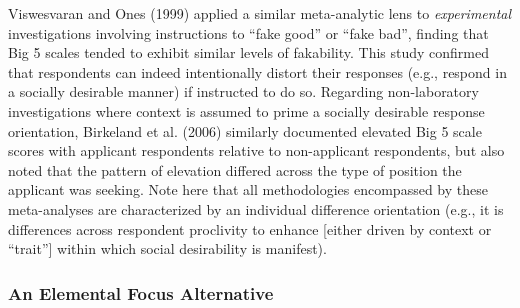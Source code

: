 \documentclass[
  english,
  ,jou]{apa6}
\begin{document}
Viswesvaran and Ones (1999) applied a similar meta-analytic lens to \emph{experimental} investigations involving instructions to \enquote{fake good} or \enquote{fake bad}, finding that Big 5 scales tended to exhibit similar levels of fakability. This study confirmed that respondents can indeed intentionally distort their responses (e.g., respond in a socially desirable manner) if instructed to do so. Regarding non-laboratory investigations where context is assumed to prime a socially desirable response orientation, Birkeland et al. (2006) similarly documented elevated Big 5 scale scores with applicant respondents relative to non-applicant respondents, but also noted that the pattern of elevation differed across the type of position the applicant was seeking. Note here that all methodologies encompassed by these meta-analyses are characterized by an individual difference orientation (e.g., it is differences across respondent proclivity to enhance {[}either driven by context or \enquote{trait}{]} within which social desirability is manifest).

\hypertarget{an-elemental-focus-alternative}{%
\subsubsection{An Elemental Focus Alternative}\label{an-elemental-focus-alternative}}
\end{document}
